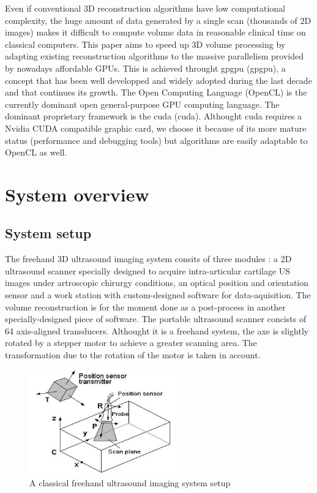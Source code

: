 \documentclass[12pt,journal,compsoc]{IEEEtran}
\begin{document}
Even if conventional 3D reconstruction algorithms have low computational complexity, the huge amount of data generated by a single scan (thousands of 2D images) makes it difficult to compute volume data in reasonable clinical time on classical computers.
This paper aims to speed up 3D volume processing by adapting existing reconstruction algorithms to the massive parallelism provided by nowadays affordable GPUs. This is achieved throught \acl{gpgpu} (\ac{gpgpu}), a concept that has been well developped and widely adopted during the last decade and that continues its growth.
The Open Computing Language (OpenCL) is the currently dominant open general-purpose GPU computing language. The dominant proprietary framework is the \acl{cuda} (\ac{cuda}).
Althought \ac{cuda} requires a Nvidia CUDA compatible graphic card, we choose it because of its more mature status (performance and debugging tools) but algorithms are easily adaptable to OpenCL as well.

\section{System overview}

\subsection{System setup}

The freehand 3D ultrasound imaging system consits of three modules : a 2D ultrasound scanner specially designed to acquire intra-articular cartilage US images under artroscopic chirurgy conditions, an optical position and orientation sensor and a work station with custom-designed software for data-aquisition. The volume reconstruction is for the moment done as a post-process in another specially-designed piece of software.
The portable ultrasound scanner concists of 64 axis-aligned transducers. Althought it is a freehand system, the axe is slightly rotated by a stepper motor to achieve a greater scanning area. The transformation due to the rotation of the motor is taken in account.

\begin{figure}[!h]
\centering
\includegraphics[width=2.5in]{freehand}
\caption{A classical freehand ultrasound imaging system setup}
\label{fig_1}
\end{figure}
\end{document}
